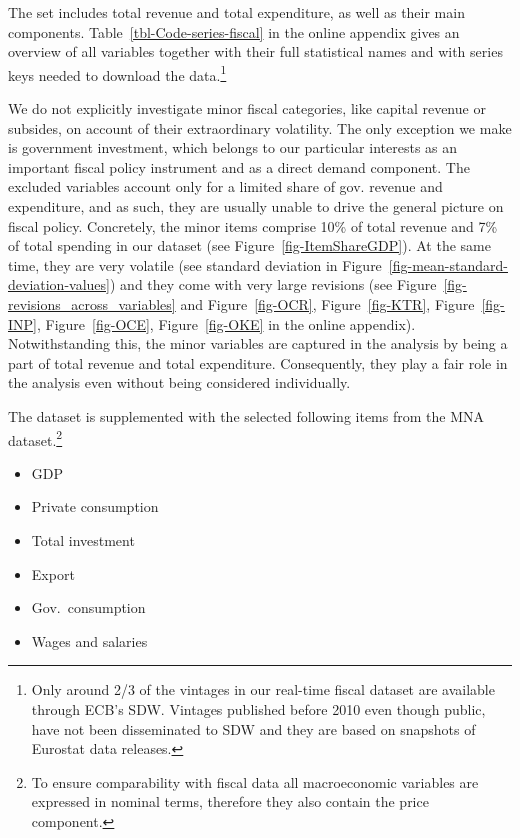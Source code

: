 \documentclass[
  letterpaper,
  authoryear,
  preprint,
  3p]{elsarticle}
\providecommand{\tightlist}{%
  \setlength{\itemsep}{0pt}\setlength{\parskip}{0pt}}\usepackage{longtable,booktabs,array}
\begin{document}
The set includes total revenue and total expenditure, as well as their
main components. Table~\ref{tbl-Code-series-fiscal} in the online
appendix gives an overview of all variables together with their full
statistical names and with series keys needed to download the
data.\footnote{Only around 2/3 of the vintages in our real-time fiscal
  dataset are available through ECB's SDW. Vintages published before
  2010 even though public, have not been disseminated to SDW and they
  are based on snapshots of Eurostat data releases.}

We do not explicitly investigate minor fiscal categories, like capital
revenue or subsides, on account of their extraordinary volatility. The
only exception we make is government investment, which belongs to our
particular interests as an important fiscal policy instrument and as a
direct demand component. The excluded variables account only for a
limited share of gov. revenue and expenditure, and as such, they are
usually unable to drive the general picture on fiscal policy.
Concretely, the minor items comprise 10\% of total revenue and 7\% of
total spending in our dataset (see Figure~\ref{fig-ItemShareGDP}). At
the same time, they are very volatile (see standard deviation in
Figure~\ref{fig-mean-standard-deviation-values}) and they come with very
large revisions (see Figure~\ref{fig-revisions_across_variables} and
Figure~\ref{fig-OCR}, Figure~\ref{fig-KTR}, Figure~\ref{fig-INP}, Figure~\ref{fig-OCE}, Figure~\ref{fig-OKE}
in the online appendix). Notwithstanding this, the minor variables are
captured in the analysis by being a part of total revenue and total
expenditure. Consequently, they play a fair role in the analysis even
without being considered individually.

The dataset is supplemented with the selected following items from the
MNA dataset.\footnote{To ensure comparability with fiscal data all
  macroeconomic variables are expressed in nominal terms, therefore they
  also contain the price component.}

\begin{itemize}
\tightlist
\item
  GDP
\item
  Private consumption
\item
  Total investment
\item
  Export
\item
  Gov.~consumption
\item
  Wages and salaries
\end{itemize}
\end{document}
